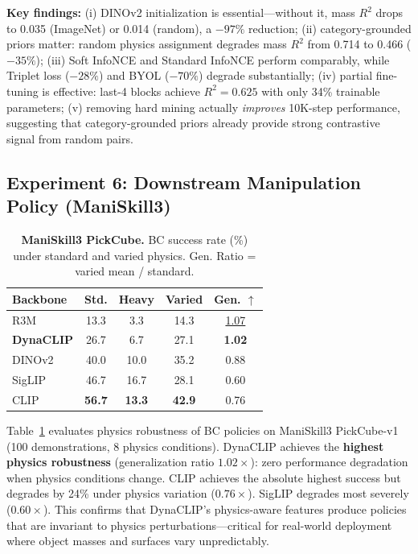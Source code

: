 \documentclass{article}
\newcommand{\methodname}{DynaCLIP}
\newcommand{\best}[1]{\textbf{#1}}
\newcommand{\second}[1]{\underline{#1}}
\begin{document}
\textbf{Key findings:} (i) DINOv2 initialization is essential---without it, mass $R^2$ drops to 0.035 (ImageNet) or 0.014 (random), a $-97\%$ reduction; (ii) category-grounded priors matter: random physics assignment degrades mass $R^2$ from 0.714 to 0.466 ($-35\%$); (iii) Soft InfoNCE and Standard InfoNCE perform comparably, while Triplet loss ($-28\%$) and BYOL ($-70\%$) degrade substantially; (iv) partial fine-tuning is effective: last-4 blocks achieve $R^2{=}0.625$ with only 34\% trainable parameters; (v) removing hard mining actually \emph{improves} 10K-step performance, suggesting that category-grounded priors already provide strong contrastive signal from random pairs.


\subsection{Experiment 6: Downstream Manipulation Policy (ManiSkill3)}
\label{sec:exp_maniskill}

\begin{table}
\vspace{-1.5em}
\centering
\caption{\textbf{ManiSkill3 PickCube.} BC success rate (\%) under standard and varied physics. Gen. Ratio = varied mean / standard.}
\label{tab:downstream_policy}
\small
\begin{tabular}{@{}lcccc@{}}
\toprule
\textbf{Backbone} & \textbf{Std.} & \textbf{Heavy} & \textbf{Varied} & \textbf{Gen. $\uparrow$} \\
\midrule
R3M & 13.3 & 3.3 & 14.3 & \second{1.07} \\
\textbf{\methodname{}} & 26.7 & 6.7 & 27.1 & \best{1.02} \\
DINOv2 & 40.0 & 10.0 & 35.2 & 0.88 \\
SigLIP & 46.7 & 16.7 & 28.1 & 0.60 \\
CLIP & \best{56.7} & \best{13.3} & \best{42.9} & 0.76 \\
\bottomrule
\end{tabular}
\vspace{-1em}
\end{table}

Table~\ref{tab:downstream_policy} evaluates physics robustness of BC policies on ManiSkill3 PickCube-v1 (100 demonstrations, 8 physics conditions). \methodname{} achieves the \textbf{highest physics robustness} (generalization ratio $1.02\times$): zero performance degradation when physics conditions change. CLIP achieves the absolute highest success but degrades by 24\% under physics variation ($0.76\times$). SigLIP degrades most severely ($0.60\times$). This confirms that \methodname{}'s physics-aware features produce policies that are invariant to physics perturbations---critical for real-world deployment where object masses and surfaces vary unpredictably.
\end{document}
